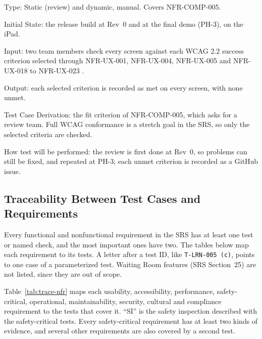\documentclass[12pt, titlepage]{article}
\begin{document}
\begin{enumerate}
Type: Static (review) and dynamic, manual. Covers NFR-COMP-005.

Initial State: the release build at Rev~0 and at the final demo (PH-3), on the iPad.

Input: two team members check every screen against each WCAG 2.2 success
criterion selected through NFR-UX-001, NFR-UX-004, NFR-UX-005 and
NFR-UX-018 to NFR-UX-023 \citep{wcag22}.

Output: each selected criterion is recorded as met on every screen, with
none unmet.

Test Case Derivation: the fit criterion of NFR-COMP-005, which asks for a
review team. Full WCAG conformance is a stretch goal in the SRS, so only
the selected criteria are checked.

How test will be performed: the review is first done at Rev~0, so problems
can still be fixed, and repeated at PH-3; each unmet criterion is recorded
as a GitHub issue.

\end{enumerate}

\subsection{Traceability Between Test Cases and Requirements}
\label{sec:trace}

Every functional and nonfunctional requirement in the SRS has at least one test
or named check, and the most important ones have two. The tables below map each requirement
to its tests. A letter after a test ID, like \texttt{T-LRN-005 (c)}, points to
one case of a parameterized test. Waiting Room features (SRS Section~25) are
not listed, since they are out of scope.

Table~\ref{tab:trace-nfr} maps each usability, accessibility, performance,
safety-critical, operational, maintainability, security, cultural and
compliance requirement
to the tests that cover it. ``SI'' is the safety inspection described with
the safety-critical tests. Every safety-critical requirement has at
least two kinds of evidence, and several other requirements are also
covered by a second test.
\end{document}
